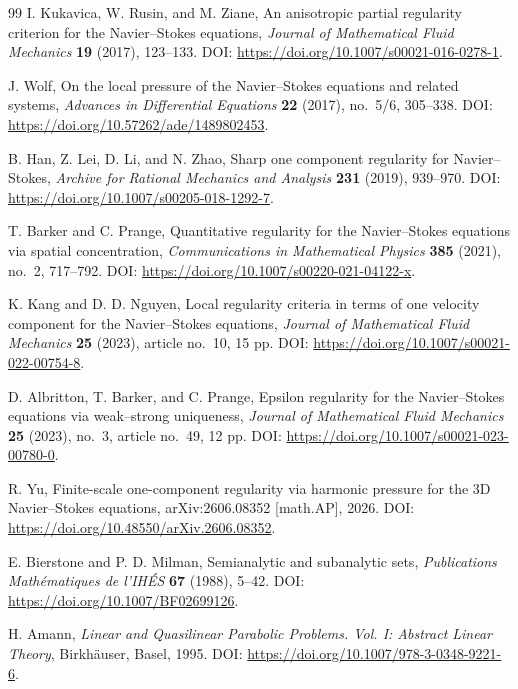 \documentclass[11pt]{article}
\numberwithin{equation}{section}
\begin{document}
\begin{thebibliography}{99}
	I. Kukavica, W. Rusin, and M. Ziane,
	An anisotropic partial regularity criterion for the Navier--Stokes equations,
	\newblock \emph{Journal of Mathematical Fluid Mechanics} \textbf{19} (2017), 123--133.
	\newblock DOI: \url{https://doi.org/10.1007/s00021-016-0278-1}.

	J. Wolf,
	On the local pressure of the Navier--Stokes equations and related systems,
	\newblock \emph{Advances in Differential Equations} \textbf{22} (2017), no.~5/6, 305--338.
	\newblock DOI: \url{https://doi.org/10.57262/ade/1489802453}.

	B. Han, Z. Lei, D. Li, and N. Zhao,
	Sharp one component regularity for Navier--Stokes,
	\newblock \emph{Archive for Rational Mechanics and Analysis} \textbf{231} (2019), 939--970.
	\newblock DOI: \url{https://doi.org/10.1007/s00205-018-1292-7}.

	T. Barker and C. Prange,
	Quantitative regularity for the Navier--Stokes equations via spatial concentration,
	\newblock \emph{Communications in Mathematical Physics} \textbf{385} (2021), no.~2, 717--792.
	\newblock DOI: \url{https://doi.org/10.1007/s00220-021-04122-x}.

	K. Kang and D. D. Nguyen,
	Local regularity criteria in terms of one velocity component for the Navier--Stokes equations,
	\newblock \emph{Journal of Mathematical Fluid Mechanics} \textbf{25} (2023), article no.~10, 15 pp.
	\newblock DOI: \url{https://doi.org/10.1007/s00021-022-00754-8}.

	D. Albritton, T. Barker, and C. Prange,
	Epsilon regularity for the Navier--Stokes equations via weak--strong uniqueness,
	\newblock \emph{Journal of Mathematical Fluid Mechanics} \textbf{25} (2023), no.~3, article no.~49, 12 pp.
	\newblock DOI: \url{https://doi.org/10.1007/s00021-023-00780-0}.

	R. Yu,
	Finite-scale one-component regularity via harmonic pressure for the 3D Navier--Stokes equations,
	\newblock arXiv:2606.08352 [math.AP], 2026.
	\newblock DOI: \url{https://doi.org/10.48550/arXiv.2606.08352}.


E. Bierstone and P. D. Milman,
Semianalytic and subanalytic sets,
\emph{Publications Math\'ematiques de l'IH\'ES} \textbf{67} (1988), 5--42.
DOI: \url{https://doi.org/10.1007/BF02699126}.

H. Amann,
\emph{Linear and Quasilinear Parabolic Problems. Vol. I: Abstract Linear Theory},
Birkh\"auser, Basel, 1995.
DOI: \url{https://doi.org/10.1007/978-3-0348-9221-6}.


\end{thebibliography}
\end{document}
